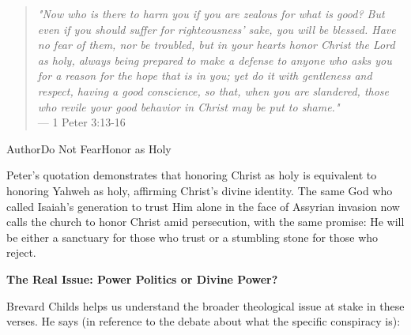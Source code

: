\documentclass[11pt]{article}
\begin{document}
\begin{quote}
\textit{"Now who is there to harm you if you are zealous for what is good? But even if you should suffer for righteousness' sake, you will be blessed. Have no fear of them, nor be troubled, but in your hearts honor Christ the Lord as holy, always being prepared to make a defense to anyone who asks you for a reason for the hope that is in you; yet do it with gentleness and respect, having a good conscience, so that, when you are slandered, those who revile your good behavior in Christ may be put to shame."}\\
\hfill --- 1 Peter 3:13-16
\end{quote}

\vspace{1em}

\begin{comparisontable}{Author}{Do Not Fear}{Honor as Holy}




\end{comparisontable}

\vspace{1em}
Peter's quotation demonstrates that honoring Christ as holy is equivalent to honoring Yahweh as holy, affirming Christ's divine identity. The same God who called Isaiah's generation to trust Him alone in the face of Assyrian invasion now calls the church to honor Christ amid persecution, with the same promise: He will be either a sanctuary for those who trust or a stumbling stone for those who reject.

\vspace{3em}
{\large\bfseries The Real Issue: Power Politics or Divine Power?}
\vspace{1em}

Brevard Childs helps us understand the broader theological issue at stake in these verses. He says (in reference to the debate about what the specific conspiracy is):
\end{document}
